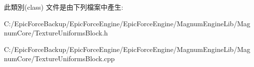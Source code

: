 此類別(class) 文件是由下列檔案中產生\+:\begin{DoxyCompactItemize}
\item 
C\+:/\+Epic\+Force\+Backup/\+Epic\+Force\+Engine/\+Epic\+Force\+Engine/\+Magnum\+Engine\+Lib/\+Magnum\+Core/Texture\+Uniforms\+Block.\+h\item 
C\+:/\+Epic\+Force\+Backup/\+Epic\+Force\+Engine/\+Epic\+Force\+Engine/\+Magnum\+Engine\+Lib/\+Magnum\+Core/Texture\+Uniforms\+Block.\+cpp\end{DoxyCompactItemize}
